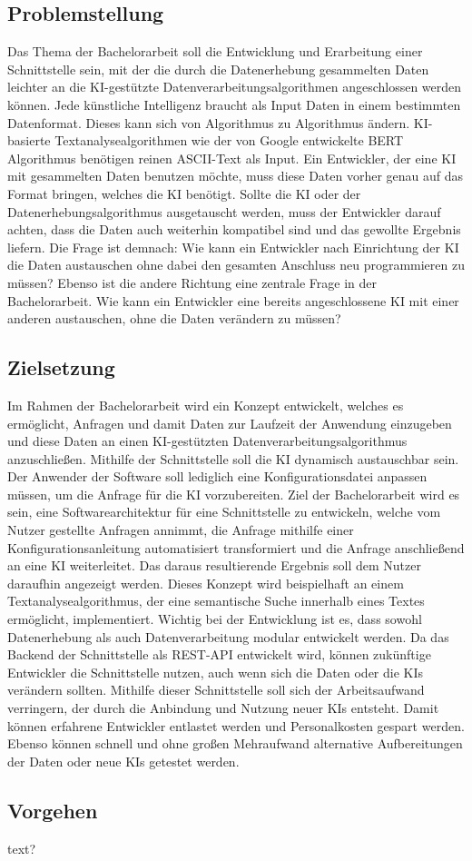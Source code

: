 \subsection{Problemstellung}
Das Thema der Bachelorarbeit soll die Entwicklung und Erarbeitung einer Schnittstelle sein, mit der die durch die Datenerhebung gesammelten Daten leichter an die KI-gestützte Datenverarbeitungsalgorithmen angeschlossen werden können. Jede künstliche Intelligenz braucht als Input Daten in einem bestimmten Datenformat. Dieses kann sich von Algorithmus zu Algorithmus ändern. KI-basierte Textanalysealgorithmen wie der von Google entwickelte BERT Algorithmus benötigen reinen ASCII-Text als Input. Ein Entwickler, der eine KI mit gesammelten Daten benutzen möchte, muss diese Daten vorher genau auf das Format bringen, welches die KI benötigt. Sollte die KI oder der Datenerhebungsalgorithmus ausgetauscht werden, muss der Entwickler darauf achten, dass die Daten auch weiterhin kompatibel sind und das gewollte Ergebnis liefern. Die Frage ist demnach: \glqq Wie kann ein Entwickler nach Einrichtung der KI die Daten austauschen ohne dabei den gesamten Anschluss neu programmieren zu müssen?\grqq{} Ebenso ist die andere Richtung eine zentrale Frage in der Bachelorarbeit. \glqq Wie kann ein Entwickler eine bereits angeschlossene KI mit einer anderen austauschen, ohne die Daten verändern zu müssen? \grqq{}

\subsection{Zielsetzung}
Im Rahmen der Bachelorarbeit wird ein Konzept entwickelt, welches es ermöglicht, Anfragen und damit Daten zur Laufzeit der Anwendung einzugeben und diese Daten an einen KI-gestützten Datenverarbeitungsalgorithmus anzuschließen. Mithilfe der Schnittstelle soll die KI dynamisch austauschbar sein. Der Anwender der Software soll lediglich eine Konfigurationsdatei anpassen müssen, um die Anfrage für die KI vorzubereiten. Ziel der Bachelorarbeit wird es sein, eine Softwarearchitektur für eine Schnittstelle zu entwickeln, welche vom Nutzer gestellte Anfragen annimmt, die Anfrage mithilfe einer Konfigurationsanleitung automatisiert transformiert und die Anfrage anschließend an eine KI weiterleitet. Das daraus resultierende Ergebnis soll dem Nutzer daraufhin angezeigt werden. Dieses Konzept wird beispielhaft an einem Textanalysealgorithmus, der eine semantische Suche innerhalb eines Textes ermöglicht, implementiert. Wichtig bei der Entwicklung ist es, dass sowohl Datenerhebung als auch Datenverarbeitung modular entwickelt werden. Da das Backend der Schnittstelle als REST-API entwickelt wird, können zukünftige Entwickler die Schnittstelle nutzen, auch wenn sich die Daten oder die KIs verändern sollten. Mithilfe dieser Schnittstelle soll sich der Arbeitsaufwand verringern, der durch die Anbindung und Nutzung neuer KIs entsteht. Damit können erfahrene Entwickler entlastet werden und Personalkosten gespart werden. Ebenso können schnell und ohne großen Mehraufwand alternative Aufbereitungen der Daten oder neue KIs getestet werden.

\subsection{Vorgehen}
text?